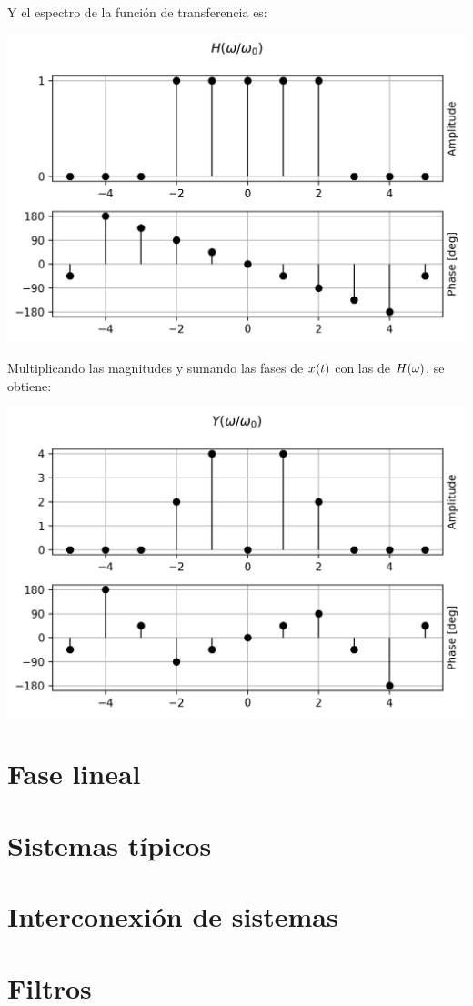 \begin{mdframed}[style=ExampleFrame]
    Y el espectro de la función de transferencia es:
    \begin{center}
        \includegraphics[width=\linewidth]{./images/ej_siemtria_hermitiana_h.png}
    \end{center}

    Multiplicando las magnitudes y sumando las fases de $\fx[x]{t}$ con las de $\fx[H]{\omega}$, se obtiene:
    \begin{center}
        \includegraphics[width=\linewidth]{./images/ej_siemtria_hermitiana_y.png}
    \end{center}
\end{mdframed}

\section{Fase lineal}

\section{Sistemas típicos}

\section{Interconexión de sistemas}

\section{Filtros}